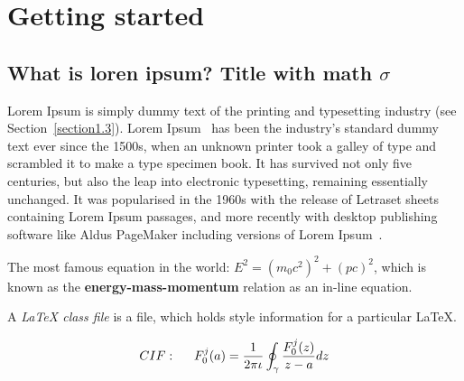 
\chapter{Getting started}  %

\ifpdf
    \graphicspath{{Chapter1/Figs/Raster/}{Chapter1/Figs/PDF/}{Chapter1/Figs/}}
\else
    \graphicspath{{Chapter1/Figs/Vector/}{Chapter1/Figs/}}
\fi


\section{What is loren ipsum? Title with math \texorpdfstring{$\sigma$}{[sigma]}} %

Lorem Ipsum is simply dummy text of the printing and typesetting industry (see 
Section~\ref{section1.3}). Lorem Ipsum~\citep{Aup91} has been the industry's 
standard dummy text ever since the 1500s, when an unknown printer took a galley 
of type and scrambled it to make a type specimen book. It has survived not only 
five centuries, but also the leap into electronic typesetting, remaining 
essentially unchanged. It was popularised in the 1960s with the release of 
Letraset sheets containing Lorem Ipsum passages, and more recently with desktop 
publishing software like Aldus PageMaker including versions of Lorem 
Ipsum~\citep{AAB95,Con90,LM65}.

The most famous equation in the world: $E^2 = (m_0c^2)^2 + (pc)^2$, which is 
known as the \textbf{energy-mass-momentum} relation as an in-line equation.

A {\em \LaTeX{} class file} is a file, which holds style information for a particular \LaTeX{}.


\begin{align}
CIF: \hspace*{5mm}F_0^j(a) = \frac{1}{2\pi \iota} \oint_{\gamma} \frac{F_0^j(z)}{z - a} dz
\end{align}

